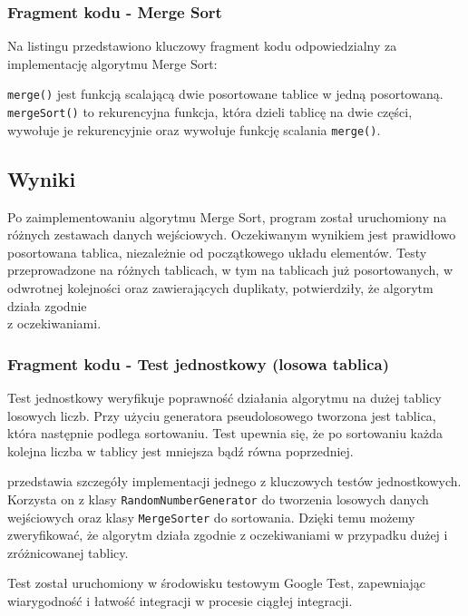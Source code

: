 \newpage

\subsubsection{Fragment kodu - Merge Sort}

Na listingu  przedstawiono kluczowy fragment kodu odpowiedzialny za implementację algorytmu Merge Sort:



\texttt{merge()} jest funkcją scalającą dwie posortowane tablice w jedną posortowaną. \texttt{mergeSort()} to rekurencyjna funkcja, która dzieli tablicę na dwie części, wywołuje je rekurencyjnie oraz wywołuje funkcję scalania \texttt{merge()}.

\subsection{Wyniki}

Po zaimplementowaniu algorytmu Merge Sort, program został uruchomiony na różnych zestawach danych wejściowych. Oczekiwanym wynikiem jest prawidłowo posortowana tablica, niezależnie od początkowego układu elementów. Testy przeprowadzone na różnych tablicach, w tym na tablicach już posortowanych, w odwrotnej kolejności oraz zawierających duplikaty, potwierdziły, że algorytm działa zgodnie \\ z oczekiwaniami.

\newpage

\subsubsection{Fragment kodu - Test jednostkowy (losowa tablica)}

Test jednostkowy weryfikuje poprawność działania algorytmu na dużej tablicy losowych liczb. Przy użyciu generatora pseudolosowego tworzona jest tablica, która następnie podlega sortowaniu. Test upewnia się, że po sortowaniu każda kolejna liczba w tablicy jest mniejsza bądź równa poprzedniej.



 przedstawia szczegóły implementacji jednego z kluczowych testów jednostkowych. Korzysta on z klasy \texttt{RandomNumberGenerator} do tworzenia losowych danych wejściowych oraz klasy \texttt{MergeSorter} do sortowania. Dzięki temu możemy zweryfikować, że algorytm działa zgodnie z oczekiwaniami w przypadku dużej i zróżnicowanej tablicy.

Test został uruchomiony w środowisku testowym Google Test, zapewniając wiarygodność i łatwość integracji w procesie ciągłej integracji.
